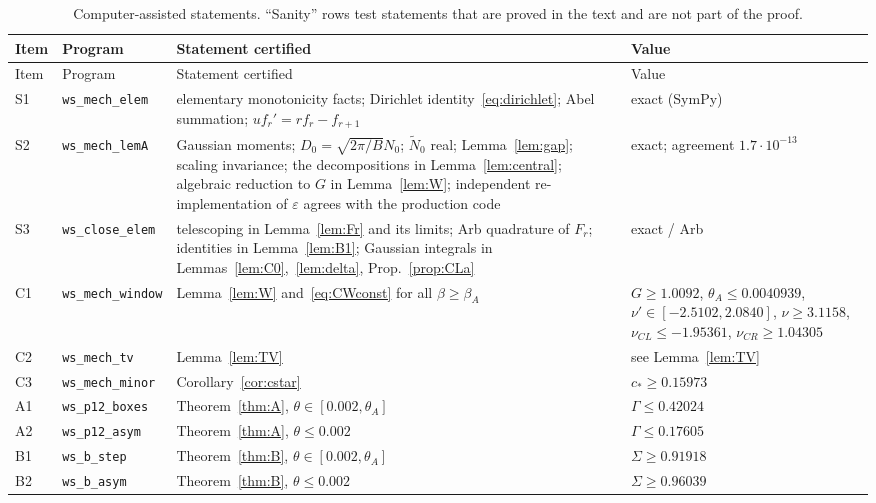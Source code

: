 \documentclass[11pt]{amsart}
\newcommand{\script}[1]{\texttt{#1}}
\theoremstyle{definition}
\theoremstyle{remark}
\numberwithin{equation}{section}
\begin{document}
{\small
\begin{longtable}{@{}>{\raggedright\arraybackslash}p{}>{\raggedright\arraybackslash}p{}>{\raggedright\arraybackslash}p{}>{\raggedright\arraybackslash}p{}@{}}
\caption{Computer-assisted statements. ``Sanity'' rows test statements that are proved in the text and are not part of the proof.}\label{tab:certs}\\
\toprule
Item & Program & Statement certified & Value \\
\midrule
\endfirsthead
\toprule
Item & Program & Statement certified & Value \\
\midrule
\endhead
\bottomrule
\endfoot
S1 & \script{ws\_mech\_elem} & elementary monotonicity facts; Dirichlet identity~\eqref{eq:dirichlet}; Abel summation; $uf_r'=rf_r-f_{r+1}$ & exact (SymPy) \\
S2 & \script{ws\_mech\_lemA} & Gaussian moments; $D_0=\sqrt{2\pi/B}N_0$; $\tilde N_0$ real; Lemma~\ref{lem:gap}; scaling invariance; the decompositions in Lemma~\ref{lem:central}; algebraic reduction to $G$ in Lemma~\ref{lem:W}; independent re-implementation of $\varepsilon$ agrees with the production code & exact; agreement $1.7\cdot10^{-13}$ \\
S3 & \script{ws\_close\_elem} & telescoping in Lemma~\ref{lem:Fr} and its limits; Arb quadrature of $F_r$; identities in Lemma~\ref{lem:B1}; Gaussian integrals in Lemmas~\ref{lem:C0},~\ref{lem:delta}, Prop.~\ref{prop:CLa} & exact / Arb \\
C1 & \script{ws\_mech\_window} & Lemma~\ref{lem:W} and~\eqref{eq:CWconst} for all $\beta\ge\beta_A$ & $G\ge1.0092$, $\theta_A\le0.0040939$, $\nu'\in[-2.5102,2.0840]$, $\nu\ge3.1158$, $\nu_{CL}\le-1.95361$, $\nu_{CR}\ge1.04305$ \\
C2 & \script{ws\_mech\_tv} & Lemma~\ref{lem:TV} & see Lemma~\ref{lem:TV} \\
C3 & \script{ws\_mech\_minor} & Corollary~\ref{cor:cstar} & $c_\ast\ge0.15973$ \\
A1 & \script{ws\_p12\_boxes} & Theorem~\ref{thm:A}, $\theta\in[0.002,\theta_A]$ & $\Gamma\le0.42024$ \\
A2 & \script{ws\_p12\_asym} & Theorem~\ref{thm:A}, $\theta\le0.002$ & $\Gamma\le0.17605$ \\
B1 & \script{ws\_b\_step} & Theorem~\ref{thm:B}, $\theta\in[0.002,\theta_A]$ & $\Sigma\ge0.91918$ \\
B2 & \script{ws\_b\_asym} & Theorem~\ref{thm:B}, $\theta\le0.002$ & $\Sigma\ge0.96039$ \\

\end{longtable}}
\end{document}
